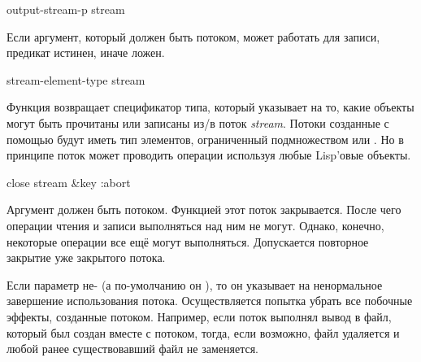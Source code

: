 \begin{defun}[Функция]
output-stream-p stream

Если аргумент, который должен быть потоком, может работать для записи, предикат
истинен, иначе ложен.
\end{defun}

\begin{defun}[Функция]
stream-element-type stream

Функция возвращает спецификатор типа, который указывает на то, какие объекты
могут быть прочитаны или записаны из/в поток \emph{stream}.
Потоки созданные с помощью  будут иметь тип элементов, ограниченный
подмножеством  или . Но в принципе поток может
проводить операции используя любые Lisp'овые объекты.
\end{defun}

\begin{defun}[Функция]
close stream &key :abort

Аргумент должен быть потоком.
Функцией этот поток закрывается. После чего операции чтения и записи выполняться
над ним не могут. Однако, конечно, некоторые операции все ещё могут
выполняться. Допускается повторное закрытие уже закрытого потока.

Если параметр  не-{\false} (а по-умолчанию он {\false}), то он
указывает на ненормальное завершение использования потока. Осуществляется
попытка убрать все побочные эффекты, созданные потоком. Например, если поток
выполнял вывод в файл, который был создан вместе с потоком, тогда, если
возможно, файл удаляется и любой ранее существовавший файл не заменяется.
\end{defun}

